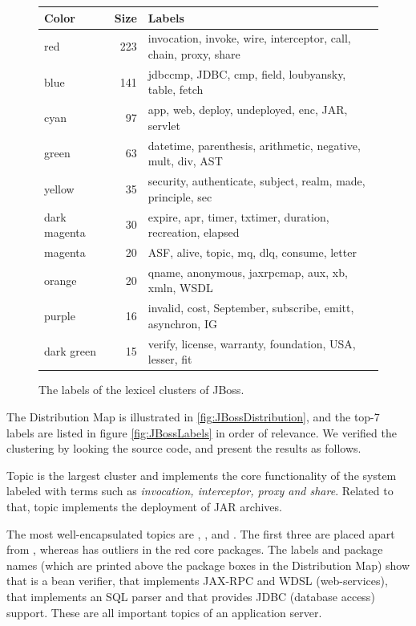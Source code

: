 \begin{figure}[h]
  \centering
  \begin{scriptsize}
  \begin{tabular}{l|rl}
    \hline
    \textbf{Color} & \textbf{Size} & \textbf{Labels}\\
    \hline
    red & 223 & invocation, invoke, wire, interceptor, call, chain, proxy, share\\
    blue & 141 & jdbccmp, JDBC, cmp, field, loubyansky, table, fetch\\
    cyan & 97 & app, web, deploy, undeployed, enc, JAR, servlet\\
    green & 63 & datetime, parenthesis, arithmetic, negative, mult, div, AST\\
    yellow & 35 & security, authenticate, subject, realm, made, principle, sec\\
    dark magenta & 30 & expire, apr, timer, txtimer, duration, recreation, elapsed\\
    magenta & 20 & ASF, alive, topic, mq, dlq, consume, letter\\
    orange & 20 & qname, anonymous, jaxrpcmap, aux, xb, xmln, WSDL\\
    purple & 16 & invalid, cost, September, subscribe, emitt, asynchron, IG\\
    dark green & 15 & verify, license, warranty, foundation, USA, lesser, fit\\
    \hline
  \end{tabular}
  \end{scriptsize}
  \caption{The labels of the lexicel clusters of JBoss.}\label{fig:JBossLabels}
\end{figure}


The Distribution Map is illustrated in \autoref{fig:JBossDistribution}, and the top-7 labels are listed in figure \autoref{fig:JBossLabels} in order of relevance. We verified the clustering by looking the source code, and present the results as follows.

Topic \red is the largest cluster and implements the core functionality of the system labeled with terms such as \emph{invocation, interceptor, proxy \emph{and} share}. Related to that, topic \cyan implements the deployment of JAR archives.

The most well-encapsulated topics are \darkgreen, \orange, \green and \blue. The first three are placed apart from \red, whereas \blue has outliers in the red core packages. The labels and package names (which are printed above the package boxes in the Distribution Map) show that \darkgreen is a bean verifier, that \orange implements JAX-RPC and WDSL (\eg web-services), that \green implements an SQL parser and that \blue provides JDBC (\eg database access) support. These are all important topics of an application server.


